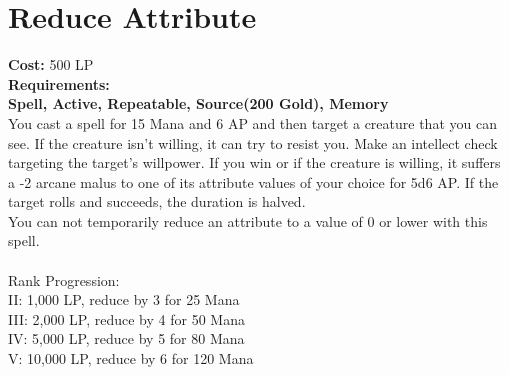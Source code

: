 \section{Reduce Attribute}\label{spell:reduceAbility}
\textbf{Cost:} 500 LP\\
\textbf{Requirements:}\\
\textbf{Spell, Active, Repeatable, Source(200 Gold), Memory}\\
You cast a spell for 15 Mana and 6 AP and then target a creature that you can see.
If the creature isn't willing, it can try to resist you.
Make an intellect check targeting the target's willpower.
If you win or if the creature is willing, it suffers a -2 arcane malus to one of its attribute values of your choice for 5d6 AP.
If the target rolls and succeeds, the duration is halved.\\
You can not temporarily reduce an attribute to a value of 0 or lower with this spell. \\
\\
Rank Progression:\\
II: 1,000 LP, reduce by 3 for 25 Mana\\
III: 2,000 LP, reduce by 4 for 50 Mana\\
IV: 5,000 LP, reduce by 5 for 80 Mana\\
V: 10,000 LP, reduce by 6 for 120 Mana\\